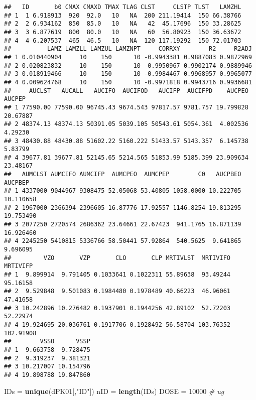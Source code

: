 \documentclass[9pt,]{krantz}
\newenvironment{Shaded}{\begin{snugshade}}{\end{snugshade}}
\newcommand{\KeywordTok}[1]{\textcolor[rgb]{0.13,0.29,0.53}{\textbf{#1}}}
\newcommand{\DecValTok}[1]{\textcolor[rgb]{0.00,0.00,0.81}{#1}}
\newcommand{\StringTok}[1]{\textcolor[rgb]{0.31,0.60,0.02}{#1}}
\newcommand{\CommentTok}[1]{\textcolor[rgb]{0.56,0.35,0.01}{\textit{#1}}}
\newcommand{\NormalTok}[1]{#1}
\begin{document}
\begin{verbatim}
##   ID       b0 CMAX CMAXD TMAX TLAG CLST     CLSTP TLST   LAMZHL
## 1  1 6.918913  920  92.0   10   NA  200 211.19414  150 66.38766
## 2  2 6.934162  850  85.0   10   NA   42  45.17696  150 33.28625
## 3  3 6.877619  800  80.0   10   NA   60  56.80923  150 36.63672
## 4  4 6.207537  465  46.5   10   NA  120 117.19292  150 72.01703
##          LAMZ LAMZLL LAMZUL LAMZNPT     CORRXY        R2     R2ADJ
## 1 0.010440904     10    150      10 -0.9943381 0.9887083 0.9872969
## 2 0.020823832     10    150      10 -0.9950967 0.9902174 0.9889946
## 3 0.018919466     10    150      10 -0.9984467 0.9968957 0.9965077
## 4 0.009624768     10    150      10 -0.9971818 0.9943716 0.9936681
##     AUCLST   AUCALL   AUCIFO  AUCIFOD   AUCIFP  AUCIFPD    AUCPEO   AUCPEP
## 1 77590.00 77590.00 96745.43 9674.543 97817.57 9781.757 19.799828 20.67887
## 2 48374.13 48374.13 50391.05 5039.105 50543.61 5054.361  4.002536  4.29230
## 3 48430.88 48430.88 51602.22 5160.222 51433.57 5143.357  6.145738  5.83799
## 4 39677.81 39677.81 52145.65 5214.565 51853.99 5185.399 23.909634 23.48167
##   AUMCLST AUMCIFO AUMCIFP  AUMCPEO  AUMCPEP        C0   AUCPBEO   AUCPBEP
## 1 4337000 9044967 9308475 52.05068 53.40805 1058.0000 10.222705 10.110658
## 2 1967000 2366394 2396605 16.87776 17.92557 1146.8254 19.813295 19.753490
## 3 2077250 2720574 2686362 23.64661 22.67423  941.1765 16.871139 16.926460
## 4 2245250 5410815 5336766 58.50441 57.92864  540.5625  9.641865  9.696095
##         VZO       VZP       CLO       CLP MRTIVLST  MRTIVIFO  MRTIVIFP
## 1  9.899914  9.791405 0.1033641 0.1022311 55.89638  93.49244  95.16158
## 2  9.529848  9.501083 0.1984480 0.1978489 40.66223  46.96061  47.41658
## 3 10.242896 10.276482 0.1937901 0.1944256 42.89102  52.72203  52.22974
## 4 19.924695 20.036761 0.1917706 0.1928492 56.58704 103.76352 102.91908
##        VSSO      VSSP
## 1  9.663758  9.728475
## 2  9.319237  9.381321
## 3 10.217007 10.154796
## 4 19.898788 19.847860
\end{verbatim}

\begin{Shaded}
\begin{Highlighting}[]
\NormalTok{IDs =}\StringTok{ }\KeywordTok{unique}\NormalTok{(dPK01[,}\StringTok{"ID"}\NormalTok{])}
\NormalTok{nID =}\StringTok{ }\KeywordTok{length}\NormalTok{(IDs)}
\NormalTok{DOSE =}\StringTok{ }\DecValTok{10000} \CommentTok{# ug}
\end{Highlighting}
\end{Shaded}
\end{document}
